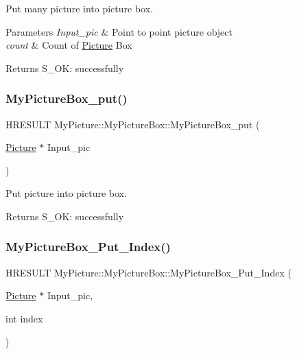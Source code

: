 Put many picture into picture box. 


\begin{DoxyParams}{Parameters}
{\em Input\+\_\+pic} & Point to point picture object \\
\hline
{\em count} & Count of \hyperlink{class_my_picture_1_1_picture}{Picture} Box \\
\hline
\end{DoxyParams}
\begin{DoxyReturn}{Returns}
S\+\_\+\+OK\+: successfully 
\end{DoxyReturn}
\mbox{\label{class_my_picture_1_1_my_picture_box_a2b89cd943586dff163a84dbda739c7c8}} 
\subsubsection{\texorpdfstring{My\+Picture\+Box\+\_\+put()}{MyPictureBox\_put()}}
{\footnotesize\ttfamily H\+R\+E\+S\+U\+LT My\+Picture\+::\+My\+Picture\+Box\+::\+My\+Picture\+Box\+\_\+put (\begin{DoxyParamCaption}\item[{\hyperlink{class_my_picture_1_1_picture}{Picture} $\ast$}]{Input\+\_\+pic }\end{DoxyParamCaption})\hspace{0.3cm}{\ttfamily [inline]}}



Put picture into picture box. 

\begin{DoxyReturn}{Returns}
S\+\_\+\+OK\+: successfully 
\end{DoxyReturn}
\mbox{\label{class_my_picture_1_1_my_picture_box_a94ead24e0dc6272c16dcb7009e71b18e}} 
\subsubsection{\texorpdfstring{My\+Picture\+Box\+\_\+\+Put\+\_\+\+Index()}{MyPictureBox\_Put\_Index()}}
{\footnotesize\ttfamily H\+R\+E\+S\+U\+LT My\+Picture\+::\+My\+Picture\+Box\+::\+My\+Picture\+Box\+\_\+\+Put\+\_\+\+Index (\begin{DoxyParamCaption}\item[{\hyperlink{class_my_picture_1_1_picture}{Picture} $\ast$}]{Input\+\_\+pic,  }\item[{int}]{index }\end{DoxyParamCaption})\hspace{0.3cm}{\ttfamily [inline]}}



